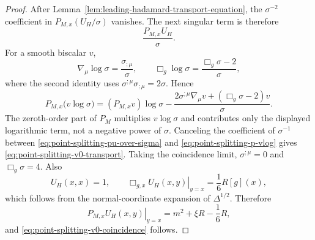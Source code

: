\begin{proof}
After Lemma~\ref{lem:leading-hadamard-transport-equation}, the
\(\sigma^{-2}\) coefficient in \(P_{M,x}(U_H/\sigma)\) vanishes.  The next
singular term is therefore
\begin{equation}
  \frac{P_{M,x}U_H}{\sigma}.
  \label{eq:point-splitting-pu-over-sigma}
\end{equation}
For a smooth biscalar \(v\),
\begin{equation}
  \nabla_\mu\log\sigma=\frac{\sigma_{;\mu}}{\sigma},
  \qquad
  \Box_g\log\sigma
  =
  \frac{\Box_g\sigma-2}{\sigma},
  \label{eq:point-splitting-box-log-sigma}
\end{equation}
where the second identity uses
\(\sigma^{;\mu}\sigma_{;\mu}=2\sigma\).  Hence
\begin{equation}
  P_{M,x}\bigl(v\log\sigma\bigr)
  =
  (P_{M,x}v)\log\sigma
  -
  \frac{
    2\sigma^{;\mu}\nabla_\mu v
    +(\Box_g\sigma-2)v
  }{\sigma}.
  \label{eq:point-splitting-p-vlog}
\end{equation}
The zeroth-order part of \(P_M\) multiplies \(v\log\sigma\) and contributes
only the displayed logarithmic term, not a negative power of \(\sigma\).
Canceling the coefficient of \(\sigma^{-1}\) between
\eqref{eq:point-splitting-pu-over-sigma} and
\eqref{eq:point-splitting-p-vlog} gives
\eqref{eq:point-splitting-v0-transport}.  Taking the coincidence limit,
\(\sigma^{;\mu}=0\) and \(\Box_g\sigma=4\).  Also
\begin{equation}
  U_H(x,x)=1,\qquad
  \left.\Box_{g,x}U_H(x,y)\right|_{y=x}=\frac16R[g](x),
  \label{eq:point-splitting-delta-box-coincidence}
\end{equation}
which follows from the normal-coordinate expansion of
\(\Delta^{1/2}\).  Therefore
\[
  \left.P_{M,x}U_H(x,y)\right|_{y=x}
  =
  m^2+\xi R-\frac16R,
\]
and \eqref{eq:point-splitting-v0-coincidence} follows.
\end{proof}

